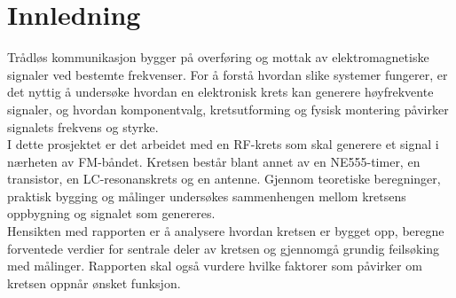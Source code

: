 \section{Innledning}

Trådløs kommunikasjon bygger på overføring og mottak av elektromagnetiske signaler ved bestemte frekvenser. For å forstå hvordan slike systemer fungerer, er det nyttig å undersøke hvordan en elektronisk krets kan generere høyfrekvente signaler, og hvordan komponentvalg, kretsutforming og fysisk montering påvirker signalets frekvens og styrke.
\\[1em]
I dette prosjektet er det arbeidet med en RF-krets som skal generere et signal i nærheten av FM-båndet. Kretsen består blant annet av en NE555-timer, en transistor, en LC-resonanskrets og en antenne. Gjennom teoretiske beregninger, praktisk bygging og målinger undersøkes sammenhengen mellom kretsens oppbygning og signalet som genereres.
\\[1em]
Hensikten med rapporten er å analysere hvordan kretsen er bygget opp, beregne forventede verdier for sentrale deler av kretsen og gjennomgå grundig feilsøking med målinger. Rapporten skal også vurdere hvilke faktorer som påvirker om kretsen oppnår ønsket funksjon.